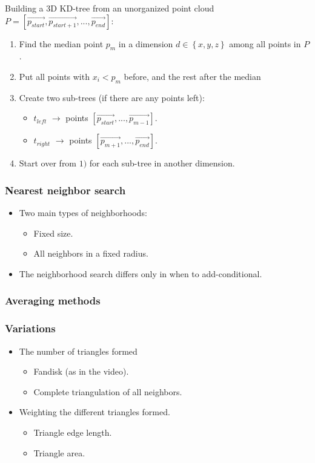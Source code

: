 \documentclass[11pt]{article}
\begin{document}
Building a 3D KD-tree from an unorganized point cloud \(P=[\vec{p_{start}},\vec{p_{start+1}},...,\vec{p_{end}}]\):
\begin{enumerate}
\item Find the median point \(p_m\) in a dimension \(d \in \left\{x,y,z\right\}\) among all points in \(P\).
\item Put all points with \(x_i < p_m\) before, and the rest after the median
\item Create two sub-trees (if there are any points left):
\begin{itemize}
\item \(t_{left}\) \(\rightarrow\) points \([\vec{p_{start}},...,\vec{p_{m-1}}]\).
\item \(t_{right}\) \(\rightarrow\) points \([\vec{p_{m+1}},...,\vec{p_{end}}]\).
\end{itemize}
\item Start over from \(1)\) for each sub-tree in another dimension.
\end{enumerate}

\subsubsection*{Nearest neighbor search}
\label{sec:org186f185}
\begin{itemize}
\item Two main types of neighborhoods:
\begin{itemize}
\item Fixed size.
\item All neighbors in a fixed radius.
\end{itemize}
\item The neighborhood search differs only in when to add-conditional.
\end{itemize}


\subsubsection*{Averaging methods}
\label{sec:org06ecc3c}

\subsubsection*{Variations}
\label{sec:orgbfea3dd}
\begin{itemize}
\item The number of triangles formed
\begin{itemize}
\item Fandisk (as in the video).
\item Complete triangulation of all neighbors.
\end{itemize}
\item Weighting the different triangles formed.
\begin{itemize}
\item Triangle edge length.
\item Triangle area.
\end{itemize}
\end{itemize}
\end{document}
